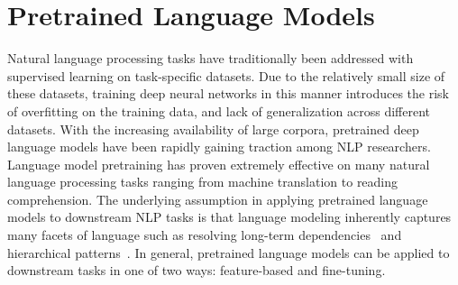 
\section{Pretrained Language Models}
\label{lm}

Natural language processing tasks have traditionally been addressed with supervised learning on task-specific datasets.
Due to the relatively small size of these datasets, training deep neural networks in this manner introduces the risk of overfitting on the training data, and lack of generalization across different datasets.
With the increasing availability of large corpora, pretrained deep language models have been rapidly gaining traction among NLP researchers.
Language model pretraining has proven extremely effective on many natural language processing tasks ranging from machine translation to reading comprehension.
The underlying assumption in applying pretrained language models to downstream NLP tasks is that language modeling inherently captures many facets of language such as resolving long-term dependencies~\cite{DBLP:journals/corr/LinzenDG16} and hierarchical patterns~\cite{DBLP:journals/corr/abs-1803-11138}.
In general, pretrained language models can be applied to downstream tasks in one of two ways: feature-based and fine-tuning.

